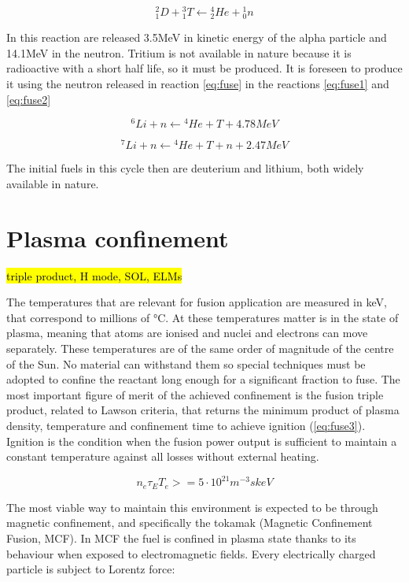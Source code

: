 \begin{equation}
{ }^2_1 D+ { }^3_1T \leftarrow { }^4_2He+{ }^1_0n
\label{eq:fuse}
\end{equation}

In this reaction are released 3.5MeV in kinetic energy of the alpha particle and 14.1MeV in the neutron. Tritium is not available in nature because it is radioactive with a short half life, so it must be produced. It is foreseen to produce it using the neutron released in reaction \ref{eq:fuse} in the reactions \ref{eq:fuse1} and \ref{eq:fuse2}

\begin{equation}
{}^{6}Li + n \leftarrow {}^{4}He +T +4.78MeV
\label{eq:fuse1}
\end{equation}

\begin{equation}
{}^{7}Li + n \leftarrow {}^{4}He +T +n +2.47MeV
\label{eq:fuse2}
\end{equation}

The initial fuels in this cycle then are deuterium and lithium, both widely available in nature.

\section{Plasma confinement}
\hl{triple product, H mode, SOL, ELMs}

The temperatures that are relevant for fusion application are measured in keV, that correspond to millions of °C. At these temperatures matter is in the state of plasma, meaning that atoms are ionised and nuclei and electrons can move separately. These temperatures are of the same order of magnitude of the centre of the Sun. No material can withstand them so special techniques must be adopted to confine the reactant long enough for a significant fraction to fuse. The most important figure of merit of the achieved confinement is the fusion triple product, related to Lawson criteria, that returns the minimum product of plasma density, temperature and confinement time to achieve ignition (\autoref{eq:fuse3}). Ignition is the condition when the fusion power output is sufficient to maintain a constant temperature against all losses without external heating.

\begin{equation}
{n_e} {\tau }_{E} T_e  >=  5\cdot{10}^{21}{ m }^{ -3 }skeV
\label{eq:fuse3}
\end{equation}

The most viable way to maintain this environment is expected to be
through magnetic confinement, and specifically the tokamak (Magnetic Confinement Fusion, MCF).
In MCF the fuel is confined in plasma state thanks to its behaviour when exposed to electromagnetic fields. Every electrically charged particle is subject to Lorentz force:


